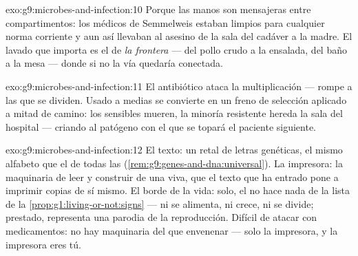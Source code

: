 \begin{solution}{exo:g9:microbes-and-infection:10}
Porque las manos son mensajeras entre compartimentos: los médicos de
Semmelweis estaban limpios para cualquier norma corriente y aun así
llevaban al asesino de la sala del cadáver a la madre. El lavado que
importa es el de \emph{la frontera} --- del pollo crudo a la ensalada,
del baño a la mesa --- donde si no la vía quedaría conectada.
\end{solution}

\begin{solution}{exo:g9:microbes-and-infection:11}
El antibiótico ataca la multiplicación --- rompe a las  que se
dividen. Usado a medias se convierte en un freno de selección aplicado
a mitad de camino: los sensibles mueren, la minoría resistente hereda
la sala del hospital --- criando al patógeno con el que se topará el
paciente siguiente.
\end{solution}

\begin{solution}{exo:g9:microbes-and-infection:12}
El texto: un retal de letras genéticas, el mismo alfabeto que el de
todas las  (\cref{rem:g9:genes-and-dna:universal}). La
impresora: la maquinaria de leer y construir de una  viva, que el
texto que ha entrado pone a imprimir copias de sí mismo. El borde de la
vida: solo, el  no hace nada de la lista de la
\cref{prop:g1:living-or-not:signs} --- ni se alimenta, ni crece, ni se
divide; prestado, representa una parodia de la reproducción. Difícil de
atacar con medicamentos: no hay maquinaria del  que envenenar ---
solo la impresora, y la impresora eres tú.
\end{solution}

